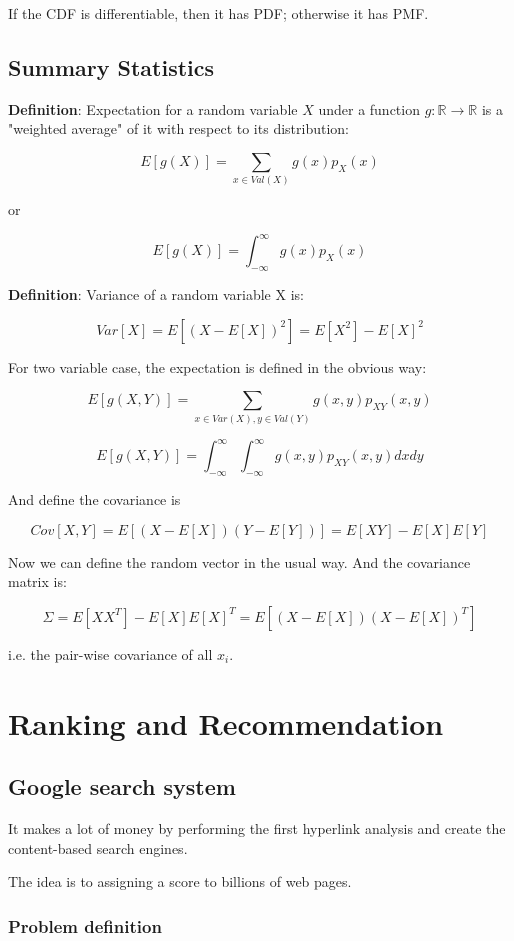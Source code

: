 \documentclass{article}
\begin{document}
If the CDF is differentiable, then it has PDF; otherwise it has PMF.

\subsection{Summary Statistics}

\textbf{Definition}: Expectation for a random variable $X$ under a function
$g:\mathbb{R}\to \mathbb{R}$
 is a "weighted average" of 
it with respect to its distribution:

$$
E[g(X)] = \sum_{x\in Val(X)} g(x)p_X(x)
$$

or


$$
E[g(X)] = \int_{-\infty}^\infty g(x)p_X(x)
$$

\textbf{Definition}: Variance of a random variable X is:

$$
Var[X] = E[(X-E[X])^2]=E[X^2]-E[X]^2
$$


For two variable case, the expectation is defined in the obvious way:

$$
E[g(X,Y)] = \sum_{x\in Var(X),y\in Val(Y)}g(x,y)p_{XY}(x,y)
$$

$$
E[g(X,Y)] = \int_{-\infty}^\infty\int_{-\infty}^\infty g(x,y)p_{XY}(x,y)dxdy
$$

And define the covariance is 

$$
Cov[X,Y] = E[(X-E[X])(Y-E[Y])] = E[XY]-E[X]E[Y]
$$

Now we can define the random vector in the usual way. And the covariance matrix is:

$$
\Sigma = E[XX^T]-E[X]E[X]^T= E[(X-E[X])(X-E[X])^T]
$$

i.e. the pair-wise covariance of all $x_i$.


\section{Ranking and Recommendation}

\subsection{Google search system}
It makes a lot of money by performing the first hyperlink analysis and create
the content-based search engines.

The idea is to assigning a score to billions of web pages.

\subsubsection{Problem definition}
\end{document}
